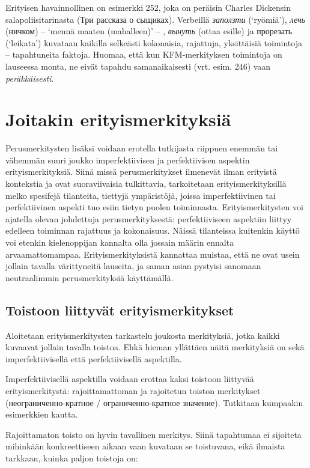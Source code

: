 \documentclass[]{scrreprt}
\begin{document}
Erityisen havainnollinen on esimerkki 252, joka on peräisin Charles
Dickensin salapoliisitarinasta (Три рассказа о сыщиках). Verbeillä
\emph{заползти} (`ryömiä'), \emph{лечь} (ничком) -- `mennä maaten
(mahalleen)' -- , \emph{вынуть} (ottaa esille) ja прорезать (`leikata')
kuvataan kaikilla selkeästi kokonaisia, rajattuja, yksittäisiä
toimintoja -- tapahtuneita faktoja. Huomaa, että kun KFM-merkityksen
toimintoja on lauseessa monta, ne eivät tapahdu samanaikaisesti (vrt.
esim. 246) vaan \emph{peräkkäisesti}.

\section{Joitakin
erityismerkityksiä}\label{joitakin-erityismerkityksiuxe4}

Perusmerkitysten lisäksi voidaan erotella tutkijasta riippuen enemmän
tai vähemmän suuri joukko imperfektiivisen ja perfektiivisen aspektin
erityismerkityksiä. Siinä missä perusmerkitykset ilmenevät ilman
erityistä kontekstia ja ovat suoraviivaisia tulkittavia, tarkoitetaan
erityismerkityksillä melko spesifejä tilanteita, tiettyjä ympäristöjä,
joissa imperfektiivinen tai perfektiivinen aspekti tuo esiin tietyn
puolen toiminnasta. Erityismerkitysten voi ajatella olevan johdettuja
perusmerkityksestä: perfektiiviseen aspektiin liittyy edelleen toiminnan
rajattuus ja kokonaisuus. Näissä tilanteissa kuitenkin käyttö voi
etenkin kielenoppijan kannalta olla jossain määrin ennalta
arvaamattomampaa. Erityismerkityksistä kannattaa muistaa, että ne ovat
usein jollain tavalla värittyneitä lauseita, ja saman asian pystyisi
sanomaan neutraalimmin perusmerkityksiä käyttämällä.

\subsection{Toistoon liittyvät
erityismerkitykset}\label{toistoon-liittyvuxe4t-erityismerkitykset}

Aloitetaan erityismerkitysten tarkastelu joukosta merkityksiä, jotka
kaikki kuvaavat jollain tavalla toistoa. Ehkä hieman yllättäen näitä
merkityksiä on sekä imperfektiivisellä että perfektiivisellä aspektilla.

Imperfektiivisellä aspektilla voidaan erottaa kaksi toistoon liittyvää
erityismerkitystä: rajoittamattoman ja rajoitetun toiston merkitykset
(неограниченно-кратное / ограниченно-кратное значение). Tutkitaan
kumpaakin esimerkkien kautta.

Rajoittamaton toisto on hyvin tavallinen merkitys. Siinä tapahtumaa ei
sijoiteta mihinkään konkreettiseen aikaan vaan kuvataan se toistuvana,
eikä ilmaista tarkkaan, kuinka paljon toistoja on:
\end{document}

